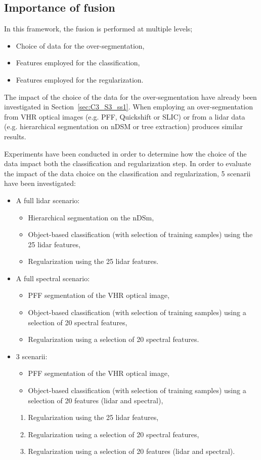 \subsection{Importance of fusion}
In this framework, the fusion is performed at multiple levels;
\begin{itemize}
\item Choice of data for the over-segmentation,
\item Features employed for the classification,
\item Features employed for the regularization.
\end{itemize}

The impact of the choice of the data for the over-segmentation have already been investigated in Section~\ref{sec:C3_S3_ss1}. When employing an over-segmentation from VHR optical images (e.g. PFF, Quickshift or SLIC) or from a lidar data (e.g. hierarchical segmentation on nDSM or tree extraction) produces similar results. 

Experiments have been conducted in order to determine how the choice of the data impact both the classification and regularization step. In order to evaluate the impact of the data choice on the classification and regularization, 5 scenarii have been investigated:
\begin{itemize}
\item A full lidar scenario:
\begin{itemize}
\item Hierarchical segmentation on the nDSm,
\item Object-based classification (with selection of training samples) using the 25 lidar features,
\item Regularization using the 25 lidar features.
\end{itemize}
\item A full spectral scenario:
\begin{itemize}
\item PFF segmentation of the VHR optical image,
\item Object-based classification (with selection of training samples) using a selection of 20 spectral features,
\item Regularization using a selection of 20 spectral features.
\end{itemize}
\item 3 scenarii:
\begin{itemize}
\item PFF segmentation of the VHR optical image,
\item Object-based classification (with selection of training samples) using a selection of 20 features (lidar and spectral),
\end{itemize}
\begin{enumerate}
\item Regularization using the 25 lidar features,
\item Regularization using a selection of 20 spectral features,
\item Regularization using a selection of 20 features (lidar and spectral).
\end{enumerate}
\end{itemize}

